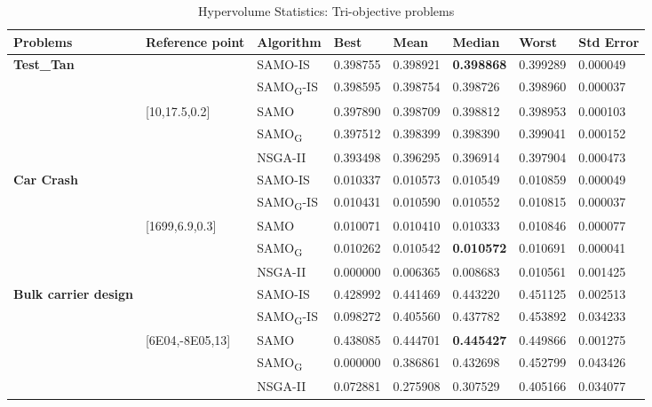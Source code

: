 \begin{table*}[!ht]\scriptsize
	\centering 
	\caption{Hypervolume Statistics: Tri-objective problems}
	\begin{tabular}{|l|l|l|l|l|l|l|l|} 
		\noalign{\smallskip}\hline 
		\textbf{Problems} & \textbf{Reference point} & \textbf{Algorithm} & \textbf{Best} & \textbf{Mean} & \textbf{Median} & \textbf{Worst} & \textbf{Std Error} \\ \hline 
		\multirow{5}{*}{\textbf{Test\_Tan}} & & SAMO-IS & 0.398755 & 0.398921 & \textbf{0.398868} & 0.399289 & 0.000049 \\ 
		& & SAMO\textsubscript{G}-IS & 0.398595 & 0.398754 & 0.398726 & 0.398960 & 0.000037 \\ 
		& [10,17.5,0.2] & SAMO & 0.397890 & 0.398709 & 0.398812 & 0.398953 & 0.000103 \\ 
		& & SAMO\textsubscript{G} & 0.397512 & 0.398399 & 0.398390 & 0.399041 & 0.000152 \\ 
		& & NSGA-II & 0.393498 & 0.396295 & 0.396914 & 0.397904 & 0.000473 \\
		\hline \multirow{5}{*}{\textbf{Car Crash}} & & SAMO-IS & 0.010337 & 0.010573 & 0.010549 & 0.010859 & 0.000049 \\ 
		& & SAMO\textsubscript{G}-IS & 0.010431 & 0.010590 & 0.010552 & 0.010815 & 0.000037 \\ 
		& [1699,6.9,0.3] & SAMO & 0.010071 & 0.010410 & 0.010333 & 0.010846 & 0.000077 \\ 
		& & SAMO\textsubscript{G} & 0.010262 & 0.010542 & \textbf{0.010572} & 0.010691 & 0.000041 \\
		& & NSGA-II & 0.000000 & 0.006365 & 0.008683 & 0.010561 & 0.001425 \\ \hline 
		\multirow{5}{*}{\textbf{Bulk carrier design}} & & SAMO-IS & 0.428992 & 0.441469 & 0.443220 & 0.451125 & 0.002513 \\
		& & SAMO\textsubscript{G}-IS & 0.098272 & 0.405560 & 0.437782 & 0.453892 & 0.034233 \\ 
		& [6E04,-8E05,13] & SAMO & 0.438085 & 0.444701 & \textbf{0.445427} & 0.449866 & 0.001275 \\ 
		& & SAMO\textsubscript{G} & 0.000000 & 0.386861 & 0.432698 & 0.452799 & 0.043426 \\ 
		& & NSGA-II & 0.072881 & 0.275908 & 0.307529 & 0.405166 & 0.034077 \\ \hline 
	\end{tabular}
	\label{tab:hvstat2} 
\end{table*}

